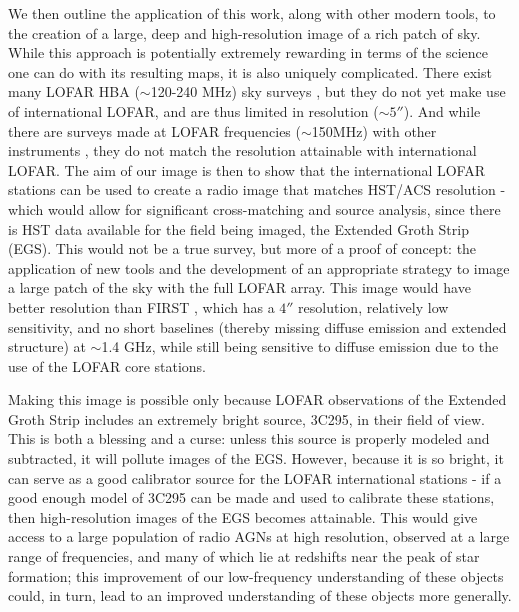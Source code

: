 \pg
We then outline the application of this work, along with other modern tools, to the creation of a large, deep and high-resolution image of a rich patch of sky. While this approach is potentially extremely rewarding in terms of the science one can do with its resulting maps, it is also uniquely complicated. There exist many LOFAR HBA ($\sim$120-240 MHz) sky surveys , but they do not yet make use of international LOFAR, and are thus limited in resolution ($\sim 5''$). And while there are surveys made at LOFAR frequencies ($\sim$150MHz) with other instruments , they do not match the resolution attainable with international LOFAR. The aim of our image is then to show that the international LOFAR stations can be used to create a radio image that matches HST/ACS resolution - which would allow for significant cross-matching and source analysis, since there is HST data available for the field being imaged, the Extended Groth Strip (EGS). This would not be a true survey, but more of a proof of concept: the application of new tools and the development of an appropriate strategy to image a large patch of the sky with the full LOFAR array. This image would have better resolution than FIRST , which has a $4''$ resolution, relatively low sensitivity, and no short baselines (thereby missing diffuse emission and extended structure) at $\sim$1.4 GHz, while still being sensitive to diffuse emission due to the use of the LOFAR core stations. 

\pg
Making this image is possible only because LOFAR observations of the Extended Groth Strip includes an extremely bright source, 3C295, in their field of view. This is both a blessing and a curse: unless this source is properly modeled and subtracted, it will pollute images of the EGS. However, because it is so bright, it can serve as a good calibrator source for the LOFAR international stations - if a good enough model of 3C295 can be made and used to calibrate these stations, then high-resolution images of the EGS becomes attainable. This would give access to a large population of radio AGNs at high resolution, observed at a large range of frequencies, and many of which lie at redshifts near the peak of star formation; this improvement of our low-frequency understanding of these objects could, in turn, lead to an improved understanding of these objects more generally.

